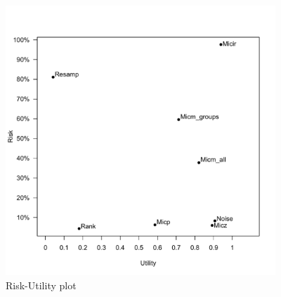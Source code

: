 \begin{figure}
\begin{center}
\includegraphics[width=4in]{R_U_plot.pdf}
\end{center}
\caption{Risk-Utility plot}
\label{fig.ruplot}
\end{figure}

